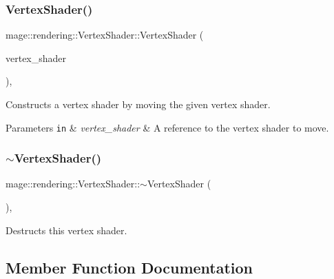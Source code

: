 \subsubsection{\texorpdfstring{Vertex\+Shader()}{VertexShader()}\hspace{0.1cm}{\footnotesize\ttfamily [3/3]}}
{\footnotesize\ttfamily mage\+::rendering\+::\+Vertex\+Shader\+::\+Vertex\+Shader (\begin{DoxyParamCaption}\item[{\hyperlink{classmage_1_1rendering_1_1_vertex_shader}{Vertex\+Shader} \&\&}]{vertex\+\_\+shader }\end{DoxyParamCaption})\hspace{0.3cm}{\ttfamily [default]}, {\ttfamily [noexcept]}}

Constructs a vertex shader by moving the given vertex shader.


\begin{DoxyParams}[1]{Parameters}
\mbox{\tt in}  & {\em vertex\+\_\+shader} & A reference to the vertex shader to move. \\
\hline
\end{DoxyParams}
\hypertarget{classmage_1_1rendering_1_1_vertex_shader_a4c57483ff1995a235472787b72ad4577}{}\label{classmage_1_1rendering_1_1_vertex_shader_a4c57483ff1995a235472787b72ad4577} 
\subsubsection{\texorpdfstring{$\sim$\+Vertex\+Shader()}{~VertexShader()}}
{\footnotesize\ttfamily mage\+::rendering\+::\+Vertex\+Shader\+::$\sim$\+Vertex\+Shader (\begin{DoxyParamCaption}{ }\end{DoxyParamCaption})\hspace{0.3cm}{\ttfamily [virtual]}, {\ttfamily [default]}}

Destructs this vertex shader. 

\subsection{Member Function Documentation}
\hypertarget{classmage_1_1rendering_1_1_vertex_shader_aa7090e902c68760713513fbfa33a1553}{}\label{classmage_1_1rendering_1_1_vertex_shader_aa7090e902c68760713513fbfa33a1553} 
